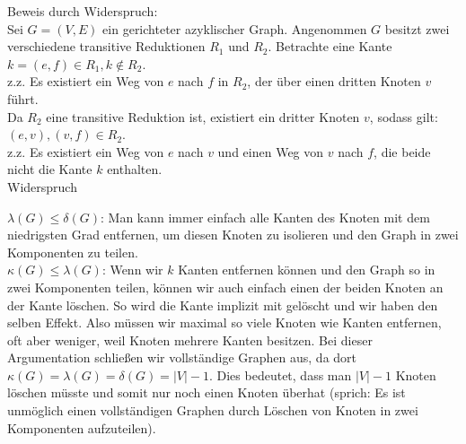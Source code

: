 \documentclass[11pt]{scrartcl} %
\begin{document}
\begin{compactenum}[(a)]
\item Beweis durch Widerspruch:\\
Sei $G=(V,E)$ ein gerichteter azyklischer Graph. Angenommen $G$ besitzt zwei verschiedene transitive Reduktionen $R_1$ und $R_2$. Betrachte eine Kante $k=(e,f) \in R_1, k \notin R_2$. \\
z.z. Es existiert ein Weg von $e$ nach $f$ in $R_2$, der über einen dritten Knoten $v$ führt.\\
Da $R_2$ eine transitive Reduktion ist, existiert ein dritter Knoten $v$, sodass gilt: $(e,v),(v,f)\in R_2$.\\
z.z. Es existiert ein Weg von $e$ nach $v$ und einen Weg von $v$ nach $f$, die beide nicht die Kante $k$ enthalten.
\\
Widerspruch
\\
\item $\lambda(G) \le \delta(G)$: Man kann immer einfach alle Kanten des Knoten mit dem niedrigsten Grad entfernen, um diesen Knoten zu isolieren und den Graph in zwei Komponenten zu teilen.\\
$\kappa(G) \le \lambda(G)$: Wenn wir $k$ Kanten entfernen können und den Graph so in zwei Komponenten teilen, können wir auch einfach einen der beiden Knoten an der Kante löschen. So wird die Kante implizit mit gelöscht und wir haben den selben Effekt. Also müssen wir maximal so viele Knoten wie Kanten entfernen, oft aber weniger, weil Knoten mehrere Kanten besitzen. Bei dieser Argumentation schließen wir vollständige Graphen aus, da dort $\kappa(G)=\lambda(G)=\delta(G)=|V|-1$. Dies bedeutet, dass man $|V|-1$ Knoten löschen müsste und somit nur noch einen Knoten überhat (sprich: Es ist unmöglich einen vollständigen Graphen durch Löschen von Knoten in zwei Komponenten aufzuteilen).

\end{compactenum}
\end{document}
